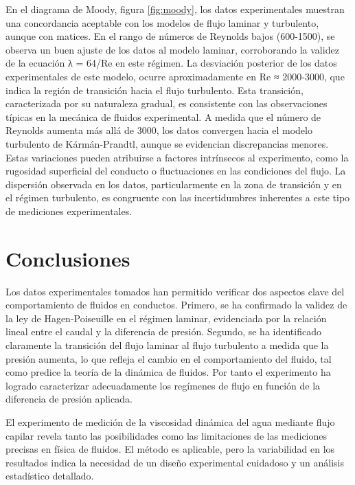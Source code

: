 	En el diagrama de Moody, figura \ref{fig:moody}, los datos experimentales muestran una concordancia aceptable con los modelos de flujo laminar y turbulento, aunque con matices. En el rango de números de Reynolds bajos (600-1500), se observa un buen ajuste  de los datos al modelo laminar, corroborando la validez de la ecuación λ = 64/Re en este régimen. La desviación posterior de los datos experimentales de este modelo, ocurre aproximadamente en Re ≈ 2000-3000, que indica la región de transición hacia el flujo turbulento. Esta transición, caracterizada por su naturaleza gradual, es consistente con las observaciones típicas en la mecánica de fluidos experimental. A medida que el número de Reynolds aumenta más allá de 3000, los datos convergen hacia el modelo turbulento de Kármán-Prandtl, aunque se evidencian discrepancias menores. Estas variaciones pueden atribuirse a factores intrínsecos al experimento, como la rugosidad superficial del conducto o fluctuaciones en las condiciones del flujo. La dispersión observada en los datos, particularmente en la zona de transición y en el régimen turbulento, es congruente con las incertidumbres inherentes a este tipo de mediciones experimentales.
	
	
	\vspace{\baselineskip} 


	\section{Conclusiones}
	
	 Los datos experimentales tomados han permitido verificar dos aspectos clave del comportamiento de fluidos en conductos. Primero, se ha confirmado la validez de la ley de Hagen-Poiseuille en el régimen laminar, evidenciada por la relación lineal entre el caudal y la diferencia de presión. Segundo, se ha identificado claramente la transición del flujo laminar al flujo turbulento a medida que la presión aumenta, lo que refleja el cambio en el comportamiento del fluido, tal como predice la teoría de la dinámica de fluidos. Por tanto  el  experimento ha logrado caracterizar adecuadamente los regímenes de flujo en función de la diferencia de presión aplicada.
	 
	 \vspace{\baselineskip}
	 
	 El experimento de medición de la viscosidad dinámica del agua mediante flujo capilar revela tanto las posibilidades como las limitaciones de las mediciones precisas en física de fluidos. El método es aplicable, pero la variabilidad en los resultados indica la necesidad de un diseño experimental cuidadoso y un análisis estadístico detallado.
	
